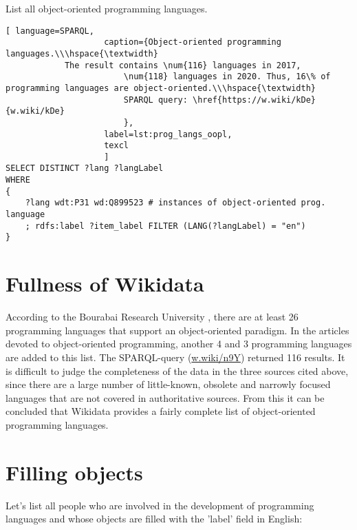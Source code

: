 List all object-oriented programming languages.

\begin{lstlisting}[ language=SPARQL, 
                    caption={Object-oriented programming languages.\\\hspace{\textwidth}
			The result contains \num{116} languages in 2017, 
                        \num{118} languages in 2020. Thus, 16\% of programming languages are object-oriented.\\\hspace{\textwidth}
                        SPARQL query: \href{https://w.wiki/kDe}{w.wiki/kDe}
                        },
                    label=lst:prog_langs_oopl,
                    texcl 
                    ]
SELECT DISTINCT ?lang ?langLabel
WHERE
{
    ?lang wdt:P31 wd:Q899523 # instances of object-oriented prog. language
    ; rdfs:label ?item_label FILTER (LANG(?langLabel) = "en") 
}
\end{lstlisting}%

\section{Fullness of Wikidata}
According to the Bourabai Research University , there are at least 26 programming languages that support an object-oriented paradigm. In the articles devoted to object-oriented programming, another 4  and 3  programming languages are added to this list. The SPARQL-query (\href{https://w.wiki/n9Y}{w.wiki/n9Y}) returned 116 results. It is difficult to judge the completeness of the data in the three sources cited above, since there are a large number of little-known, obsolete and narrowly focused languages that are not covered in authoritative sources. From this it can be concluded that Wikidata provides a fairly complete list of object-oriented programming languages.

\section{Filling objects}

Let's list all people who are involved in the development of programming languages and whose objects are filled with the 'label' field in English:

